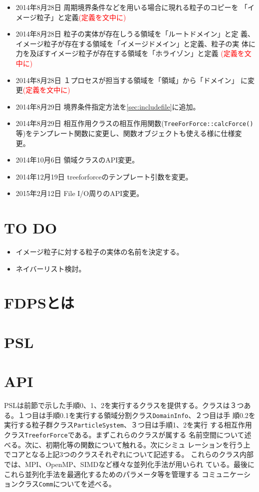 \documentclass[12pt,a4paper]{jarticle}
\newcommand{\redtext}[1]{\textcolor{red}{#1}}
\begin{document}
\begin{itemize}
\item 2014年8月28日 周期境界条件などを用いる場合に現れる粒子のコピーを
  「イメージ粒子」と定義\redtext{(定義を文中に)}
\item 2014年8月28日 粒子の実体が存在しうる領域を「ルートドメイン」と定
  義、イメージ粒子が存在する領域を「イメージドメイン」と定義、粒子の実
  体に力を及ぼすイメージ粒子が存在する領域を「ホライゾン」と定義
  \redtext{(定義を文中に)}
\item 2014年8月28日 １プロセスが担当する領域を「領域」から「ドメイン」
  に変更\redtext{(定義を文中に)}
\item 2014年8月29日 境界条件指定方法を\ref{sec:includefile}に追加。
\item 2014年8月29日 相互作用クラスの相互作用関数({\tt TreeForForce::calcForce()}等)をテンプレート関数に変更し、関数オブジェクトも使える様に仕様変更。
\item 2014年10月6日 領域クラスのAPI変更。
\item 2014年12月19日 treeforforceのテンプレート引数を変更。
\item 2015年2月12日 File I/O周りのAPI変更。
\end{itemize}

\section{TO DO}
\begin{itemize}
\item イメージ粒子に対する粒子の実体の名前を決定する。
\item ネイバーリスト検討。
\end{itemize}

\section{FDPSとは}


\section{PSL}
\label{sec:algorithm}


\section{API}
\label{sec:api}

PSLは前節で示した手順0、1、2を実行するクラスを提供する。クラスは３つあ
る。１つ目は手順0.1を実行する領域分割クラス{\tt DomainInfo}、２つ目は手
順0.2を実行する粒子群クラス{\tt ParticleSystem}、３つ目は手順1、2を実行
する相互作用クラス{\tt TreeforForce}である。まずこれらのクラスが属する
名前空間について述べる。次に、初期化等の関数について触れる。次にシミュ
レーションを行う上でコアとなる上記3つのクラスそれぞれについて記述する。
これらのクラス内部では、MPI、OpenMP、SIMDなど様々な並列化手法が用いられ
ている。最後にこれら並列化手法を最適化するためのパラメータ等を管理する
コミュニケーションクラス{\tt Comm}についてを述べる。
\end{document}
